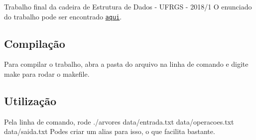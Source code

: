 Trabalho final da cadeira de Estrutura de Dados -\/ U\+F\+R\+GS -\/ 2018/1 O enunciado do trabalho pode ser encontrado \href{https://moodle.inf.ufrgs.br/pluginfile.php/123790/mod_resource/content/0/trabalho2018-1.pdf}{\tt aqui}.

\subsection*{Compilação}

Para compilar o trabalho, abra a pasta do arquivo na linha de comando e digite {\ttfamily make} para rodar o makefile.

\subsection*{Utilização}

Pela linha de comando, rode {\ttfamily ./arvores data/entrada.\+txt data/operacoes.\+txt data/saida.\+txt} Podes criar um alias para isso, o que facilita bastante. 